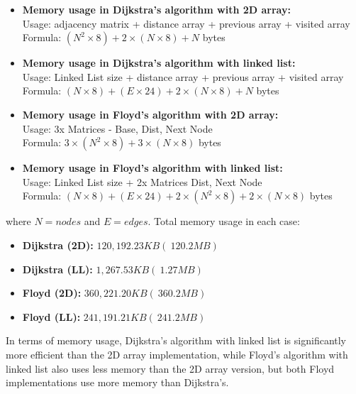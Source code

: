 \documentclass[11pt, a4paper]{article}
\begin{document}
\begin{itemize}
  \item \textbf{Memory usage in Dijkstra's algorithm with 2D array:} \\
  Usage: adjacency matrix + distance array + previous array + visited array\\
  Formula: $(N^2 \times 8) + 2 \times (N \times 8) + N$ bytes \\

  \item \textbf{Memory usage in Dijkstra's algorithm with linked list:} \\
  Usage: Linked List size + distance array + previous array + visited array\\
  Formula: $(N \times 8) + (E \times 24) + 2 \times (N \times 8) + N$ bytes \\

  \item \textbf{Memory usage in Floyd's algorithm with 2D array:} \\
  Usage: 3x Matrices - Base, Dist, Next Node \\
  Formula: $3 \times (N^2 \times 8) + 3 \times (N \times 8)$ bytes \\

  \item \textbf{Memory usage in Floyd's algorithm with linked list:} \\
  Usage: Linked List size + 2x Matrices Dist, Next Node\\
  Formula: $(N \times 8) + (E \times 24) + 2 \times (N^2 \times 8) + 2 \times (N \times 8)$ bytes \\

\end{itemize}
where $N = nodes $ and $E = edges $. Total memory usage in each case:
\begin{itemize}
  \item \textbf{Dijkstra (2D):} $120,192.23 KB (~120.2 MB)$
  \item \textbf{Dijkstra (LL):} $1,267.53 KB (~1.27 MB)$
  \item \textbf{Floyd (2D):} $360,221.20 KB (~360.2 MB)$
  \item \textbf{Floyd (LL):} $241,191.21 KB (~241.2 MB)$
\end{itemize}
In terms of memory usage, Dijkstra's algorithm with linked list is significantly more efficient than the 2D array implementation, while Floyd's algorithm with linked list also uses less memory than the 2D array version, but both Floyd implementations use more memory than Dijkstra's.
\end{document}
